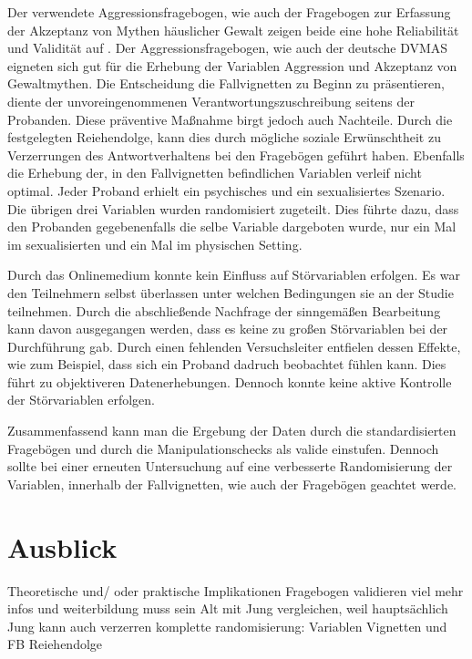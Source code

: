 Der verwendete Aggressionsfragebogen, wie auch der Fragebogen zur Erfassung der Akzeptanz von Mythen häuslicher Gewalt zeigen beide eine hohe Reliabilität und Validität auf \parencite{Peters2003, Aggressionsfragebogen}. Der Aggressionsfragebogen, wie auch der deutsche DVMAS eigneten sich gut für die Erhebung der Variablen Aggression und Akzeptanz von Gewaltmythen. 
Die Entscheidung die Fallvignetten zu Beginn zu präsentieren, diente der unvoreingenommenen Verantwortungszuschreibung seitens der Probanden. Diese präventive Maßnahme birgt jedoch auch Nachteile. Durch die festgelegten Reiehendolge, kann dies durch mögliche soziale Erwünschtheit zu Verzerrungen des Antwortverhaltens bei den Fragebögen geführt haben. Ebenfalls die Erhebung der, in den Fallvignetten befindlichen Variablen verleif nicht optimal. Jeder Proband erhielt ein psychisches und ein sexualisiertes Szenario. Die übrigen drei Variablen wurden randomisiert zugeteilt. Dies führte dazu, dass den Probanden gegebenenfalls die selbe Variable dargeboten wurde, nur ein Mal im sexualisierten und ein Mal im physischen Setting. 

Durch das Onlinemedium konnte kein Einfluss auf Störvariablen erfolgen. Es war den Teilnehmern selbst überlassen unter welchen Bedingungen sie an der Studie teilnehmen. Durch die abschließende Nachfrage der sinngemäßen Bearbeitung kann davon ausgegangen werden, dass es keine zu großen Störvariablen bei der Durchführung gab. Durch einen fehlenden Versuchsleiter entfielen dessen Effekte, wie zum Beispiel, dass sich ein Proband dadruch beobachtet fühlen kann. Dies führt zu objektiveren Datenerhebungen. Dennoch konnte keine aktive Kontrolle der Störvariablen erfolgen.

Zusammenfassend kann man die Ergebung der Daten durch die standardisierten Fragebögen und durch die Manipulationschecks als valide einstufen. Dennoch sollte bei einer erneuten Untersuchung auf eine verbesserte Randomisierung der Variablen, innerhalb der Fallvignetten, wie auch der Fragebögen geachtet werde. 


\section{Ausblick}
Theoretische und/ oder praktische Implikationen     \label{sec_5.4}
Fragebogen validieren
viel mehr infos und weiterbildung muss sein
Alt mit Jung vergleichen, weil hauptsächlich Jung kann auch verzerren
komplette randomisierung: Variablen Vignetten und FB Reiehendolge